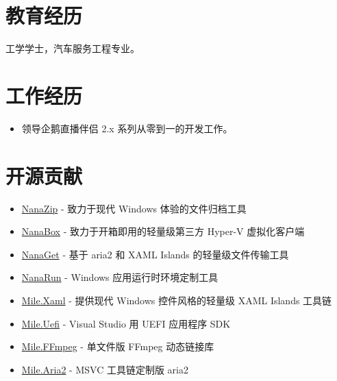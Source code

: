\documentclass{resume}
\begin{document}
\renewcommand\headrulewidth{0pt}



\section{教育经历}

  工学学士，汽车服务工程专业。

\section{工作经历}

\begin{itemize}
  \item 领导企鹅直播伴侣 2.x 系列从零到一的开发工作。
\end{itemize}

\section{开源贡献}

\begin{itemize}
  \item \href{https://github.com/M2Team/NanaZip}{NanaZip} - 致力于现代 Windows 体验的文件归档工具
  \item \href{https://github.com/M2Team/NanaBox}{NanaBox} - 致力于开箱即用的轻量级第三方 Hyper-V 虚拟化客户端
  \item \href{https://github.com/M2Team/NanaGet}{NanaGet} - 基于 aria2 和 XAML Islands 的轻量级文件传输工具
  \item \href{https://github.com/M2Team/NanaRun}{NanaRun} - Windows 应用运行时环境定制工具
\end{itemize} 

\begin{itemize}
  \item \href{https://github.com/ProjectMile/Mile.Xaml}{Mile.Xaml} - 提供现代 Windows 控件风格的轻量级 XAML Islands 工具链
  \item \href{https://github.com/ProjectMile/Mile.Uefi}{Mile.Uefi} - Visual Studio 用 UEFI 应用程序 SDK
  \item \href{https://github.com/ProjectMile/Mile.FFmpeg}{Mile.FFmpeg} - 单文件版 FFmpeg 动态链接库
  \item \href{https://github.com/ProjectMile/Mile.Aria2}{Mile.Aria2} - MSVC 工具链定制版 aria2
\end{itemize} 
\end{document}

